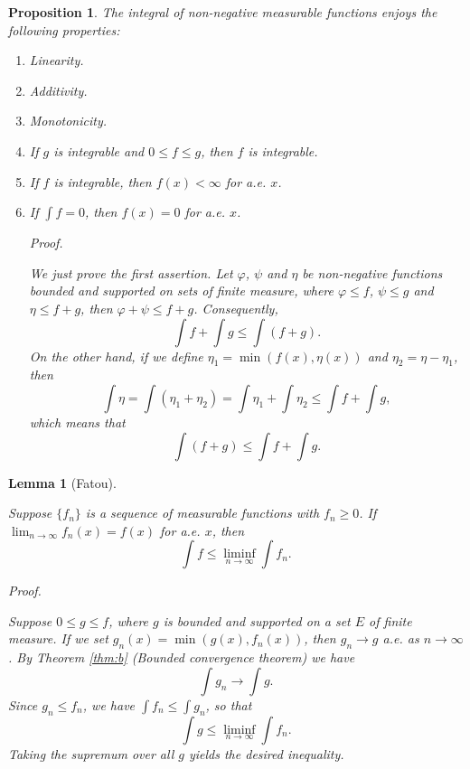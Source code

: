 \documentclass[
]{book}
\providecommand{\tightlist}{%
  \setlength{\itemsep}{0pt}\setlength{\parskip}{0pt}}
\newtheorem{lemma}{Lemma}[chapter]
\newtheorem{proposition}{Proposition}[chapter]
\theoremstyle{definition}
\theoremstyle{definition}
\theoremstyle{definition}
\theoremstyle{definition}
\theoremstyle{remark}
\begin{document}
\begin{proposition}

The integral of non-negative measurable functions enjoys the following properties:

\begin{enumerate}
\def\labelenumi{\arabic{enumi}.}
\tightlist
\item
  Linearity.
\item
  Additivity.
\item
  Monotonicity.
\item
  If \(g\) is integrable and \(0\le f\le g\), then \(f\) is integrable.
\item
  If \(f\) is integrable, then \(f(x)<\infty\) for a.e. \(x\).
\item
  If \(\int f=0\), then \(f(x)=0\) for a.e. \(x\).

  \emph{Proof.}

  We just prove the first assertion. Let \(\varphi\), \(\psi\) and \(\eta\) be non-negative functions bounded and supported on sets of finite measure, where \(\varphi\le f\), \(\psi\le g\) and \(\eta\le f+g\), then \(\varphi+\psi\le f+g\). Consequently,
  \[
  \int f+ \int g\le \int (f+g).
  \]
  On the other hand, if we define \(\eta_1=\min(f(x),\eta(x))\) and \(\eta_2=\eta-\eta_1\), then
  \[
  \int \eta=\int(\eta_1+\eta_2)=\int \eta_1+\int \eta_2\le\int f+ \int g,
  \]
  which means that
  \[
  \int (f+g)\le \int f+ \int g.
  \]
\end{enumerate}

\end{proposition}

\begin{lemma}[Fatou]
\protect\hypertarget{lem:fatou}{}\label{lem:fatou}\leavevmode

Suppose \(\{f_n\}\) is a sequence of measurable functions with \(f_n\ge 0\). If \(\lim_{n\to\infty}f_n(x)=f(x)\) for a.e. \(x\), then
\[
\int f\leq \liminf_{n\to\infty}\int f_n.
\]

\emph{Proof.}

Suppose \(0\le g\le f\), where \(g\) is bounded and supported on a set \(E\) of finite measure. If we set \(g_n(x)=\min(g(x),f_n(x))\), then \(g_n\to g\) a.e. as \(n\to \infty\). By Theorem \ref{thm:b} (Bounded convergence theorem) we have
\[
\int g_n\to \int g.
\]
Since \(g_n\le f_n\), we have \(\int f_n\le \int g_n\), so that
\[
\int g\le \liminf_{n\to\infty}\int f_n.
\]
Taking the supremum over all \(g\) yields the desired inequality.

\end{lemma}
\end{document}
